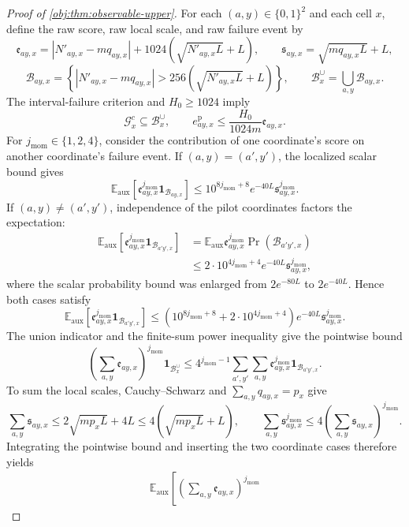 \documentclass[11pt]{article}
\begin{document}
\begin{proof}[Proof of \cref{obj:thm:observable-upper}]
For each \((a,y)\in\{0,1\}^2\) and each cell \(x\), define the raw score, raw local scale, and raw failure event by
\[
\mathfrak e_{ay,x}
=|N'_{ay,x}-mq_{ay,x}|
+1024\left(\sqrt{N'_{ay,x}L}+L\right),
\qquad
\mathfrak s_{ay,x}=\sqrt{mq_{ay,x}L}+L,
\]
\[
\mathcal B_{ay,x}
=\left\{
|N'_{ay,x}-mq_{ay,x}|>
256\left(\sqrt{N'_{ay,x}L}+L\right)
\right\},
\qquad
\mathcal B_x^{\cup}=\bigcup_{a,y}\mathcal B_{ay,x}.
\]
The interval-failure criterion and \(H_0\ge1024\) imply
\[
\mathcal G_x^c\subseteq\mathcal B_x^{\cup},
\qquad
e_{ay,x}^{\mathrm p}
\le\frac{H_0}{1024m}\mathfrak e_{ay,x}.
\]
For \(j_{\mathrm{mom}}\in\{1,2,4\}\), consider the contribution of one coordinate's score on another coordinate's failure event. If \((a,y)=(a',y')\), the localized scalar bound gives
\[
\mathbb E_{\mathrm{aux}}\!\left[
\mathfrak e_{ay,x}^{j_{\mathrm{mom}}}\mathbf1_{\mathcal B_{ay,x}}
\right]
\le10^{8j_{\mathrm{mom}}+8}e^{-40L}
\mathfrak s_{ay,x}^{j_{\mathrm{mom}}}.
\]
If \((a,y)\ne(a',y')\), independence of the pilot coordinates factors the expectation:
\[
\begin{aligned}
\mathbb E_{\mathrm{aux}}\!\left[
\mathfrak e_{ay,x}^{j_{\mathrm{mom}}}\mathbf1_{\mathcal B_{a'y',x}}
\right]
&=\mathbb E_{\mathrm{aux}}\mathfrak e_{ay,x}^{j_{\mathrm{mom}}}
\Pr(\mathcal B_{a'y',x})\\
&\le2\cdot10^{4j_{\mathrm{mom}}+4}e^{-40L}
\mathfrak s_{ay,x}^{j_{\mathrm{mom}}},
\end{aligned}
\]
where the scalar probability bound was enlarged from \(2e^{-80L}\) to \(2e^{-40L}\). Hence both cases satisfy
\[
\mathbb E_{\mathrm{aux}}\!\left[
\mathfrak e_{ay,x}^{j_{\mathrm{mom}}}\mathbf1_{\mathcal B_{a'y',x}}
\right]
\le
\left(10^{8j_{\mathrm{mom}}+8}+2\cdot10^{4j_{\mathrm{mom}}+4}\right)
e^{-40L}\mathfrak s_{ay,x}^{j_{\mathrm{mom}}}.
\]
The union indicator and the finite-sum power inequality give the pointwise bound
\[
\left(\sum_{a,y}\mathfrak e_{ay,x}\right)^{j_{\mathrm{mom}}}
\mathbf1_{\mathcal B_x^{\cup}}
\le4^{j_{\mathrm{mom}}-1}
\sum_{a',y'}\sum_{a,y}
\mathfrak e_{ay,x}^{j_{\mathrm{mom}}}
\mathbf1_{\mathcal B_{a'y',x}}.
\]
To sum the local scales, Cauchy--Schwarz and \(\sum_{a,y}q_{ay,x}=p_x\) give
\[
\sum_{a,y}\mathfrak s_{ay,x}
\le2\sqrt{mp_xL}+4L
\le4\left(\sqrt{mp_xL}+L\right),
\qquad
\sum_{a,y}\mathfrak s_{ay,x}^{j_{\mathrm{mom}}}
\le4\left(\sum_{a,y}\mathfrak s_{ay,x}\right)^{j_{\mathrm{mom}}}.
\]
Integrating the pointwise bound and inserting the two coordinate cases therefore yields
\[
\begin{aligned}
\mathbb E_{\mathrm{aux}}\!\left[
\left(\sum_{a,y}\mathfrak e_{ay,x}\right)^{j_{\mathrm{mom}}}

\end{aligned}\]
\end{proof}
\end{document}
